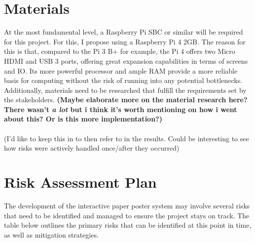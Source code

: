 \section{Materials}
At the most fundamental level, a Raspberry Pi SBC or similar will be required for this project. For this, I propose using a Raspberry Pi 4 2GB. The reason for this is that, compared to the Pi 3 B+ for example, the Pi 4 offers two Micro HDMI and USB 3 ports, offering great expansion capabilities in terms of screens and IO. Its more powerful processor and ample RAM provide a more reliable basis for computing without the risk of running into any potential bottlenecks.
Additionally, materials need to be researched that fulfill the requirements set by the stakeholders. \textbf{(Maybe elaborate more on the material research here? There wasn't \textit{a lot} but i think it's worth mentioning on how i went about this? Or is this more implementation?)}\\\\


(I'd like to keep this in to then refer to in the results. Could be interesting to see how risks were actively handled once/after they occurred)\\

\section{Risk Assessment Plan}

The development of the interactive paper poster system may involve several risks that need to be identified and managed to ensure the project stays on track. The table below outlines the primary risks that can be identified at this point in time, as well as mitigation strategies.

